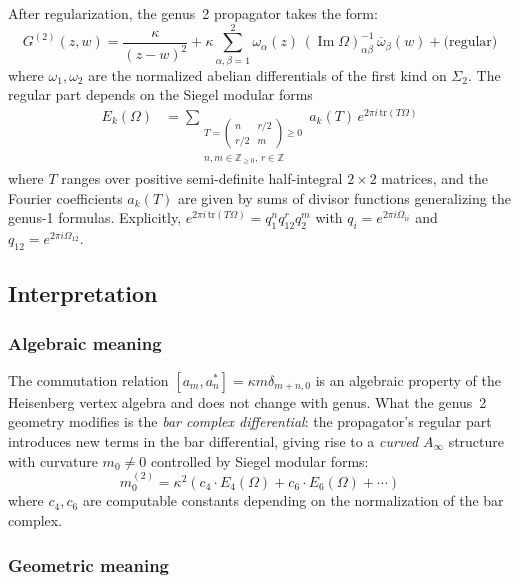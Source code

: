 After regularization, the genus~2 propagator takes the form:
\[
G^{(2)}(z,w) = \frac{\kappa}{(z-w)^2}
+ \kappa \sum_{\alpha,\beta=1}^{2} \omega_\alpha(z)\,(\operatorname{Im}\Omega)^{-1}_{\alpha\beta}\,
\overline{\omega}_\beta(w) + \text{(regular)}
\]
where $\omega_1, \omega_2$ are the normalized abelian differentials of the first kind on $\Sigma_2$.
The regular part depends on the Siegel modular forms
\begin{align}
E_k(\Omega) &= \sum_{\substack{T = \left(\begin{smallmatrix} n & r/2 \\ r/2 & m \end{smallmatrix}\right) \geq 0 \\ n, m \in \mathbb{Z}_{\geq 0},\, r \in \mathbb{Z}}} a_k(T)\, e^{2\pi i \,\mathrm{tr}(T \Omega)}
\end{align}
where $T$ ranges over positive semi-definite half-integral $2 \times 2$ matrices, and the Fourier coefficients $a_k(T)$ are given by sums of divisor functions generalizing the genus-1 formulas. Explicitly, $e^{2\pi i\,\mathrm{tr}(T\Omega)} = q_1^n q_{12}^r q_2^m$ with $q_i = e^{2\pi i \Omega_{ii}}$ and $q_{12} = e^{2\pi i \Omega_{12}}$.

\subsection{Interpretation}

\subsubsection{Algebraic meaning}

The commutation relation $[a_m, a^*_n] = \kappa m \delta_{m+n,0}$ is an algebraic property
of the Heisenberg vertex algebra and does not change with genus. What the genus~2
geometry modifies is the \emph{bar complex differential}: the propagator's regular part
introduces new terms in the bar differential, giving rise to a \emph{curved}
$A_\infty$ structure with curvature $m_0 \neq 0$ controlled by Siegel modular forms:
\[m_0^{(2)} = \kappa^2 \left( c_4 \cdot E_4(\Omega) + c_6 \cdot E_6(\Omega) + \cdots \right)\]
where $c_4, c_6$ are computable constants depending on the normalization of the bar complex.

\subsubsection{Geometric meaning}

